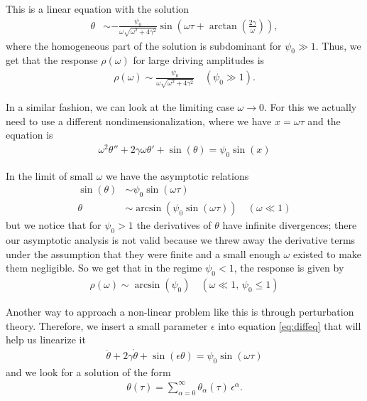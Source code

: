 \documentclass[10pt,a4paper,twocolumn]{article}
\begin{document}
This is a linear equation with the solution
%
\begin{align}
\theta &\sim - \frac{\psi_0}{\omega \sqrt{\omega^2 + 4\gamma^2}} \sin\left(\omega \tau + \arctan\left(\frac{2 \gamma}{\omega}\right)\right),
\end{align}
%
where the homogeneous part of the solution is subdominant for $\psi_0 \gg 1$. Thus, we get that the response $\rho(\omega)$ for large driving amplitudes is
%
\begin{align}
\rho(\omega) \sim \frac{\psi_0}{\omega \sqrt{\omega^2 + 4\gamma^2}} \quad (\psi_0 \gg 1).
\end{align}

In a similar fashion, we can look at the limiting case $\omega \rightarrow 0 $. For this we actually need to use a different nondimensionalization, where we have $x = \omega \tau$ and the equation is
%
\begin{align}
\omega^2 \theta'' + 2 \gamma \omega \theta' + \sin(\theta) = \psi_0 \sin(x)
\end{align}

In the limit of small $\omega$ we have the asymptotic relations
%
\begin{align}
\sin(\theta) &\sim \psi_0 \sin(\omega \tau) \\
\theta &\sim \arcsin(\psi_0 \sin(\omega \tau)) \quad (\omega \ll 1)
\end{align}
%
but we notice that for $\psi_0 > 1$ the derivatives of $\theta$ have infinite divergences; there our asymptotic analysis is not valid because we threw away the derivative terms under the assumption that they were finite and a small enough $\omega$ existed to make them negligible. So we get that in the regime $\psi_0 < 1$, the response is given by
%
\begin{align}
\rho(\omega) \sim \arcsin(\psi_0) \quad (\omega \ll 1,\, \psi_0 \leq 1)
\end{align}


Another way to approach a non-linear problem like this is through perturbation theory. Therefore, we insert a small parameter $\epsilon$ into equation \ref{eq:diffeq} that will help us linearize it
%
\begin{align}
\ddot{\theta} + 2\gamma \dot{\theta} + \sin(\epsilon \theta) = \psi_0 \sin(\omega \tau)
\end{align}
%
and we look for a solution of the form
%
\begin{align}
\theta(\tau) = \sum_{\alpha=0}^{\infty} \theta_{\alpha}(\tau) \, \epsilon^{\alpha}.
\end{align}
\end{document}
